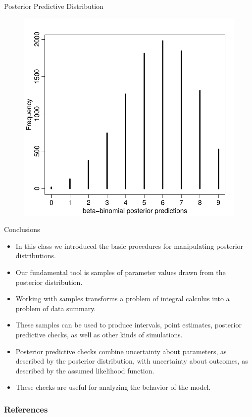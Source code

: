 \documentclass[handout]{beamer}
\begin{document}
\begin{frame}{Posterior Predictive Distribution}

   \begin{figure}[h!]
	\centering
	\includegraphics[scale=0.6]{pics/betabinom.pdf}
	\end{figure}

\end{frame}



\begin{frame}{Conclusions}
\scriptsize{

\begin{itemize}
\item In this class we introduced the basic procedures for manipulating posterior distributions.
\item Our fundamental tool is samples of parameter values drawn from the posterior distribution.
\item Working with samples transforms a problem of integral calculus into a problem of data summary. 
\item These samples can be used to produce intervals, point estimates, posterior predictive checks, as well as other kinds of simulations.
\item Posterior predictive checks combine uncertainty about parameters, as described by the posterior distribution, with uncertainty about outcomes, as described by the assumed likelihood function. 
\item These checks are useful for analyzing the behavior of the model.
\end{itemize}


} 
\end{frame}


\begin{frame}[allowframebreaks]\scriptsize
\frametitle{References}


%
\end{frame}  









\end{document}
